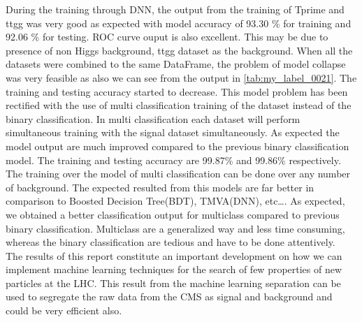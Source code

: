 During the training through DNN, the output from the training of Tprime and ttgg was very good as expected with model accuracy of 93.30 \% for training and 92.06 \% for testing. ROC curve ouput is also excellent. This may be due to presence of non Higgs background, ttgg dataset as the background. When all the datasets were combined to the same DataFrame, the problem of model collapse was very feasible as also we can see from the output in \autoref{tab:my_label_0021}. The training and testing accuracy started to decrease. This model problem has been rectified with the use of multi classification training of the dataset instead of the binary classification. In multi classification each dataset will perform simultaneous training with the signal dataset simultaneously. As expected the model output are much improved compared to the previous binary classification model. The training and testing accuracy are 99.87\% and 99.86\% respectively. \\
The training over the model of multi classification can be done over any number of background. The expected resulted from this models are far better in comparison to Boosted Decision Tree(BDT), TMVA(DNN), etc\dots. As expected, we obtained a better classification output for multiclass compared to previous binary classification. Multiclass are a generalized way and less time consuming, whereas the binary classification are tedious and have to be done attentively.\\
The results of this report constitute an important development on how we can implement machine learning techniques for the search of few properties of new particles at the LHC. This result from the machine learning separation can be used to segregate the raw data from the CMS as signal and background and could be very efficient also.
    

\setcounter{equation}{0}
\setcounter{table}{0}
\setcounter{figure}{0}


    



